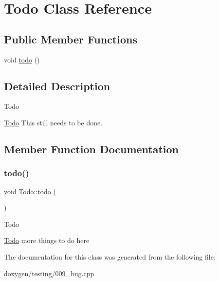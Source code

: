 \hypertarget{class_todo}{}\section{Todo Class Reference}
\label{class_todo}
\subsection*{Public Member Functions}
\begin{DoxyCompactItemize}
\item 
void \mbox{\hyperlink{class_todo_a9e70ec9176ac4c1b20e011b4daddc9d8}{todo}} ()
\end{DoxyCompactItemize}


\subsection{Detailed Description}
\begin{DoxyRefDesc}{Todo}
\item[\mbox{\hyperlink{todo__todo000003}{Todo}}]This still needs to be done. \end{DoxyRefDesc}


\subsection{Member Function Documentation}
\mbox{\label{class_todo_a9e70ec9176ac4c1b20e011b4daddc9d8}} 
\subsubsection{\texorpdfstring{todo()}{todo()}}
{\footnotesize\ttfamily void Todo\+::todo (\begin{DoxyParamCaption}{ }\end{DoxyParamCaption})}

\begin{DoxyRefDesc}{Todo}
\item[\mbox{\hyperlink{todo__todo000004}{Todo}}]more things to do here \end{DoxyRefDesc}


The documentation for this class was generated from the following file\+:\begin{DoxyCompactItemize}
\item 
doxygen/testing/009\+\_\+bug.\+cpp\end{DoxyCompactItemize}
